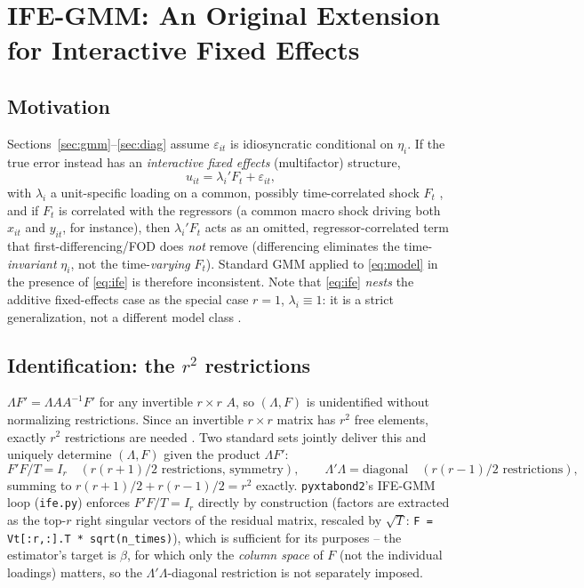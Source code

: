 \documentclass[11pt,a4paper]{article}
\newcommand{\pkg}{\texttt{pyxtabond2}}
\begin{document}
\section{IFE-GMM: An Original Extension for Interactive Fixed Effects}
\label{sec:ife}

\subsection{Motivation}

Sections~\ref{sec:gmm}--\ref{sec:diag} assume $\varepsilon_{it}$ is
idiosyncratic conditional on $\eta_i$. If the true error instead has an
\emph{interactive fixed effects} (multifactor) structure,
\begin{equation}
  u_{it} = \lambda_i'F_t + \varepsilon_{it}, \label{eq:ife}
\end{equation}
with $\lambda_i$ a unit-specific loading on a common, possibly
time-correlated shock $F_t$ \citep{Bai2009}, and if $F_t$ is correlated with
the regressors (a common macro shock driving both $x_{it}$ and $y_{it}$,
for instance), then $\lambda_i'F_t$ acts as an omitted, regressor-correlated
term that first-differencing/FOD does \emph{not} remove (differencing
eliminates the time-\emph{invariant} $\eta_i$, not the time-\emph{varying}
$F_t$). Standard GMM applied to \eqref{eq:model} in the presence of
\eqref{eq:ife} is therefore inconsistent. Note that \eqref{eq:ife}
\emph{nests} the additive fixed-effects case as the special case $r=1$,
$\lambda_i\equiv1$: it is a strict generalization, not a different model
class \citep[Section 1]{Bai2009}.

\subsection{\texorpdfstring{Identification: the $r^2$ restrictions}{Identification: the r-squared restrictions}}
\label{sec:identification}

$\Lambda F'=\Lambda AA^{-1}F'$ for any invertible $r\times r$ $A$, so
$(\Lambda,F)$ is unidentified without normalizing restrictions. Since an
invertible $r\times r$ matrix has $r^2$ free elements, exactly $r^2$
restrictions are needed \citep[Section 3.1]{Bai2009}. Two standard sets
jointly deliver this and uniquely determine $(\Lambda,F)$ given the product
$\Lambda F'$:
\[
  F'F/T = I_r \quad (r(r+1)/2\text{ restrictions, symmetry}),\qquad
  \Lambda'\Lambda = \text{diagonal} \quad (r(r-1)/2\text{ restrictions}),
\]
summing to $r(r+1)/2+r(r-1)/2=r^2$ exactly. \pkg{}'s IFE-GMM loop
(\texttt{ife.py}) enforces $F'F/T=I_r$ directly by construction (factors are
extracted as the top-$r$ right singular vectors of the residual matrix,
rescaled by $\sqrt{T}$: \texttt{F = Vt[:r,:].T * sqrt(n\_times)}), which is
sufficient for its purposes -- the estimator's target is $\beta$, for which
only the \emph{column space} of $F$ (not the individual loadings) matters,
so the $\Lambda'\Lambda$-diagonal restriction is not separately imposed.
\end{document}
